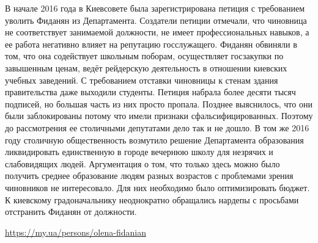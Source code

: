\begin{itemize}
В начале 2016 года в Киевсовете была зарегистрирована петиция с требованием
уволить Фиданян из Департамента. Создатели петиции отмечали, что чиновница не
соответствует занимаемой должности, не имеет профессиональных навыков, а ее
работа негативно влияет на репутацию госслужащего. Фиданян обвиняли в том, что
она содействует школьным поборам, осуществляет госзакупки по завышенным ценам,
ведёт рейдерскую деятельность в отношении киевских учебных заведений. С
требованием отставки чиновницы к стенам здания правительства даже выходили
студенты. Петиция набрала более десяти тысяч подписей, но большая часть из них
просто пропала. Позднее выяснилось, что они были заблокированы потому что имели
признаки сфальсифицированных. Поэтому до рассмотрения ее столичными депутатами
дело так и не дошло. В том же 2016 году столичную общественность возмутило
решение Департамента образования ликвидировать единственную в городе вечернюю
школу для незрячих и слабовидящих людей. Аргументация о том, что только здесь
можно было получить среднее образование людям разных возрастов с проблемами
зрения чиновников не интересовало. Для них необходимо было оптимизировать
бюджет. К киевскому градоначальнику неоднократно обращались нардепы с просьбами
отстранить Фиданян от должности.

\url{https://my.ua/persons/olena-fidanian}



\end{itemize}
